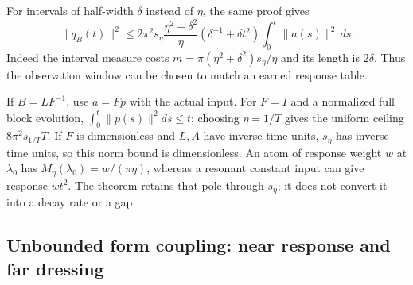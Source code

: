 \documentclass[11pt]{article}
\numberwithin{equation}{section}
\theoremstyle{definition}
\theoremstyle{remark}
\begin{document}
For intervals of half-width $\delta$ instead of $\eta$,
the same proof gives
\begin{equation}\label{p4f:eq:otherwindow}
 \|q_B(t)\|^2\le
 2\pi^2s_\eta\frac{\eta^2+\delta^2}{\eta}
           (\delta^{-1}+\delta t^2)
                      \int_0^t\|a(s)\|^2\,ds.
\end{equation}
Indeed the interval measure costs
$m=\pi(\eta^2+\delta^2)s_\eta/\eta$ and its length is
$2\delta$. Thus the observation window can be chosen
to match an earned response table.

If $B=LF^{-1}$, use $a=Fp$ with the actual input.
For $F=I$ and a normalized full block evolution,
$\int_0^t\|p(s)\|^2ds\le t$; choosing $\eta=1/T$
gives the uniform ceiling $8\pi^2s_{1/T}T$.
If $F$ is dimensionless and $L,A$ have inverse-time
units, $s_\eta$ has inverse-time units, so this norm
bound is dimensionless.
An atom of response weight $w$ at $\lambda_0$ has
$M_\eta(\lambda_0)=w/(\pi\eta)$, whereas a resonant
constant input can give response $wt^2$.
The theorem retains that pole through $s_\eta$; it
does not convert it into a decay rate or a gap.

\subsection{Unbounded form coupling: near response and far dressing}
\end{document}
